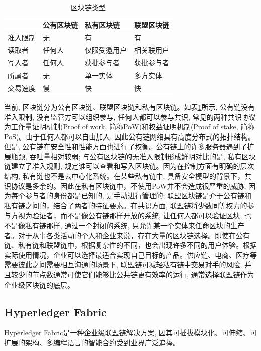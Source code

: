 {\footnotesize
\begin{longtable}[h]{m{70pt} m{70pt} m{70pt} m{70pt}}
    \caption[区块链类型]{区块链类型} \label{blockchain_type} \\
        \toprule   
        &\textbf{公有区块链}&\textbf{私有区块链}&\textbf{联盟区块链}\\
        \hline
        准入限制&无&有&有\\
        
        读取者&任何人&仅限受邀用户&相关联用户\\
        
        写入者&任何人&获批参与者&获批参与者\\
        
        所属者&无&单一实体&多方实体\\
        
        交易速度&慢&快&快\\
        \bottomrule
    \end{longtable}
}

当前, 区块链分为公有区块链、联盟区块链和私有区块链。如表\ref{blockchain_type}所示, 公有链没有准入限制, 没有监管方可以组织参与, 任何人都可以参与共识, 常见的两种共识协议为工作量证明机制(Proof of work, 简称PoW)和权益证明机制(Proof of stake, 简称PoS)。由于任何人都可以自由加入, 因此公有链网络具有高度分布式的拓扑结构。但是, 公有链在安全性和性能方面也进行了权衡。公有链上的许多服务器遇到了扩展瓶颈, 吞吐量相对较弱; 与公有区块链的无准入限制形成鲜明对比的是, 私有区块链建立了准入规则, 规定谁可以查看和写入区块链。因为在控制方面有明确的层次结构, 私有链也不是去中心化系统。在某些私有链中, 具备安全模型的背景下，共识协议是多余的。因此在私有区块链中，不使用PoW并不会造成很严重的威胁, 因为每个参与者的身份都是已知的, 是手动进行管理的; 联盟区块链是介于公有链和私有链之间的，结合了两者的特征要素。在共识方面, 联盟链将少数同等权力的参与方视为验证者，而不是像公有链那样开放的系统, 让任何人都可以验证区块, 也不是像私有链那样, 通过一个封闭的系统, 只允许某一个实体来任命区块的生产者。对于从事各类活动的个人和企业来说，存在大量的区块链选择。即使在公有链、私有链和联盟链中，根据复杂性的不同，也会出现许多不同的用户体验。根据实际使用情况，企业可以选择最适合实现自己目标的产品。供应链、电商、医疗等需要彼此之间需要相互沟通的场景下, 联盟链可减轻私有链中交易对手的风险, 并且较少的节点数通常可使它们能够比公共链更有效率的运行, 通常选择联盟链作为企业级区块链的底层。

\subsection{Hyperledger Fabric}
Hyperledger Fabric\footnotemark[1]是一种企业级联盟链解决方案, 因其可插拔模块化、可伸缩、可扩展的架构、多编程语言的智能合约受到业界广泛追捧。

